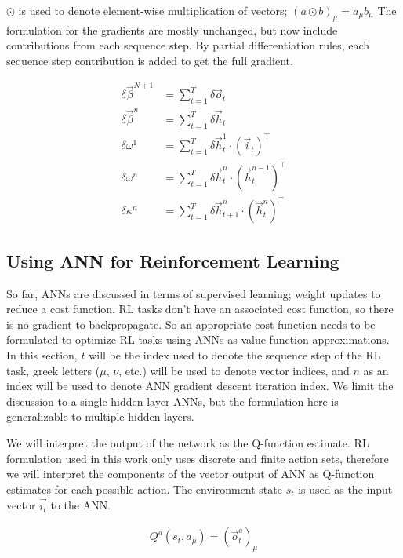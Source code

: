 \documentclass[../dissertation.tex]{subfiles}
\begin{document}
$\odot$ is used to denote element-wise multiplication of vectors; $(a \odot b)_\mu = a_\mu b_\mu$
The formulation for the gradients are mostly unchanged, but now include contributions from each sequence step.
By partial differentiation rules, each sequence step contribution is added to get the full gradient.

\begin{align}
    \delta \vec{\beta}^{N+1}    & = \sum_{t = 1}^T \delta \vec{o}_t \\
    \delta \vec{\beta}^n        & = \sum_{t = 1}^T \delta \vec{h}_t \\
    \delta \omega^1             & = \sum_{t = 1}^T \delta \vec{h}^1_t \cdot \left( \vec{i}_t \right)^\intercal \\
    \delta \omega^n             & = \sum_{t = 1}^T \delta \vec{h}^n_t \cdot \left( \vec{h}^{n - 1}_t \right)^\intercal \\
    \delta \kappa^n             & = \sum_{t = 1}^T \delta \vec{h}^n_{t + 1} \cdot \left( \vec{h}^n_t \right)^\intercal
\end{align}

\subsection{Using ANN for Reinforcement Learning}

So far, ANNs are discussed in terms of supervised learning; weight updates to reduce a cost function.
RL tasks don't have an associated cost function, so there is no gradient to backpropagate.
So an appropriate cost function needs to be formulated to optimize RL tasks using ANNs as value function approximations.
In this section, $t$ will be the index used to denote the sequence step of the RL task,
greek letters ($\mu$, $\nu$, etc.) will be used to denote vector indices,
and $n$ as an index will be used to denote ANN gradient descent iteration index.
We limit the discussion to a single hidden layer ANNs, but the formulation here is generalizable to multiple hidden layers.

We will interpret the output of the network as the Q-function estimate.
RL formulation used in this work only uses discrete and finite action sets, therefore we will interpret the components of the vector output of ANN as Q-function estimates for each possible action.
The environment state $s_t$ is used as the input vector $\vec{i_t}$ to the ANN.

\begin{align}
    Q^a(s_t, a_\mu) = \left( \vec{o}^a_t \right)_\mu
\end{align}
\end{document}
